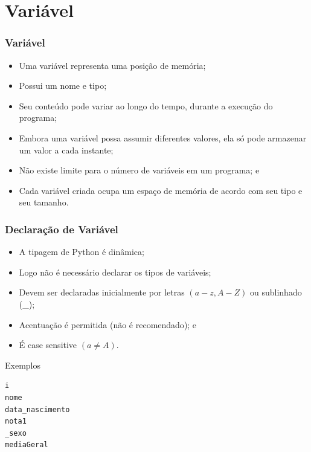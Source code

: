 \documentclass{beamer}
\begin{document}
\section{Variável}

\begin{frame}
\frametitle{Variável}

\begin{itemize}
	\item Uma variável representa uma posição de memória;
	\item Possui um nome e tipo;
	\item Seu conteúdo pode variar ao longo do tempo, durante a execução do
	programa;
	\item Embora uma variável possa assumir diferentes valores, ela só pode
	armazenar um valor a cada instante;
	\item Não existe limite para o número de variáveis em um programa; e
	\item Cada variável criada ocupa um espaço de memória de acordo com seu
	tipo e seu tamanho.
\end{itemize}

\end{frame}

\begin{frame}[fragile]
\frametitle{Declaração de Variável}

\begin{itemize}
	\item A tipagem de Python é dinâmica;
	\item Logo não é necessário declarar os tipos de variáveis;
	\item Devem ser declaradas inicialmente por letras $(a - z, A - Z)$ ou sublinhado (\_);
	\item Acentuação é permitida (\alert{não é recomendado}); e
	\item É case sensitive $(a \neq A)$.
\end{itemize}\vfill

\begin{exampleblock}{Exemplos}
	\begin{lstlisting}	
i
nome
data_nascimento
nota1
_sexo
mediaGeral
	\end{lstlisting}
\end{exampleblock}
\end{frame}
\end{document}
